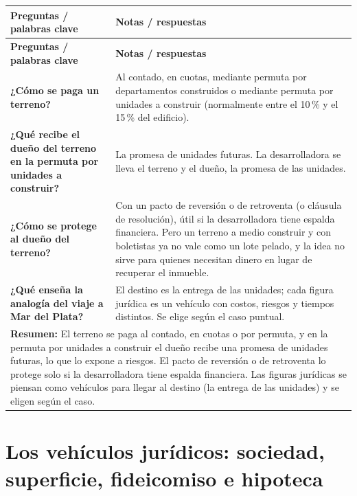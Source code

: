 \documentclass[12pt,oneside]{book}
\newcommand{\cornellresumen}[1]{%
  \multicolumn{2}{p{\dimexpr0.89\textwidth+2\tabcolsep\relax}}{\textbf{Resumen:} #1}\\}
\begin{document}
\begin{longtable}{p{}p{}}
\toprule
\textbf{Preguntas / palabras clave} & \textbf{Notas / respuestas} \\
\midrule
\endfirsthead
\toprule
\textbf{Preguntas / palabras clave} & \textbf{Notas / respuestas} \\
\midrule
\endhead

\textbf{¿Cómo se paga un terreno?} &
Al contado, en cuotas, mediante permuta por departamentos construidos o mediante permuta por unidades a construir (normalmente entre el 10\,\% y el 15\,\% del edificio). \\[0.6em]

\textbf{¿Qué recibe el dueño del terreno en la permuta por unidades a construir?} &
La promesa de unidades futuras. La desarrolladora se lleva el terreno y el dueño, la promesa de las unidades. \\[0.6em]

\textbf{¿Cómo se protege al dueño del terreno?} &
Con un pacto de reversión o de retroventa (o cláusula de resolución), útil si la desarrolladora tiene espalda financiera. Pero un terreno a medio construir y con boletistas ya no vale como un lote pelado, y la idea no sirve para quienes necesitan dinero en lugar de recuperar el inmueble. \\[0.6em]

\textbf{¿Qué enseña la analogía del viaje a Mar del Plata?} &
El destino es la entrega de las unidades; cada figura jurídica es un vehículo con costos, riesgos y tiempos distintos. Se elige según el caso puntual. \\

\midrule
\cornellresumen{El terreno se paga al contado, en cuotas o por permuta, y en la permuta por unidades a construir el dueño recibe una promesa de unidades futuras, lo que lo expone a riesgos. El pacto de reversión o de retroventa lo protege solo si la desarrolladora tiene espalda financiera. Las figuras jurídicas se piensan como vehículos para llegar al destino (la entrega de las unidades) y se eligen según el caso.}
\bottomrule
\end{longtable}

\chapter[Los vehículos jurídicos]{Los vehículos jurídicos: sociedad, superficie, fideicomiso e hipoteca}
\end{document}
